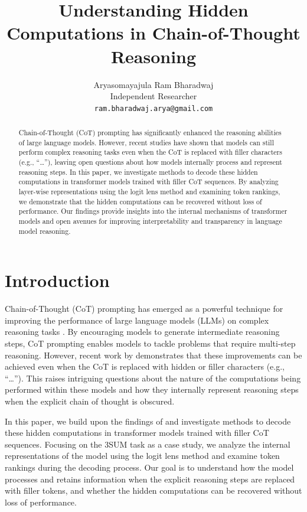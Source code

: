 \documentclass{article}
\title{Understanding Hidden Computations in Chain-of-Thought Reasoning}
\author{Aryasomayajula Ram Bharadwaj \\
Independent Researcher \\
\texttt{ram.bharadwaj.arya@gmail.com}}
\date{}
\begin{document}
\maketitle

\begin{abstract}
Chain-of-Thought (CoT) prompting has significantly enhanced the reasoning abilities of large language models. However, recent studies have shown that models can still perform complex reasoning tasks even when the CoT is replaced with filler characters (e.g., ``\ldots''), leaving open questions about how models internally process and represent reasoning steps. In this paper, we investigate methods to decode these hidden computations in transformer models trained with filler CoT sequences. By analyzing layer-wise representations using the logit lens method and examining token rankings, we demonstrate that the hidden computations can be recovered without loss of performance. Our findings provide insights into the internal mechanisms of transformer models and open avenues for improving interpretability and transparency in language model reasoning.
\end{abstract}

\section{Introduction}

Chain-of-Thought (CoT) prompting has emerged as a powerful technique for improving the performance of large language models (LLMs) on complex reasoning tasks \cite{wei2022chain}. By encouraging models to generate intermediate reasoning steps, CoT prompting enables models to tackle problems that require multi-step reasoning. However, recent work by \cite{pfau2023let} demonstrates that these improvements can be achieved even when the CoT is replaced with hidden or filler characters (e.g., ``\ldots''). This raises intriguing questions about the nature of the computations being performed within these models and how they internally represent reasoning steps when the explicit chain of thought is obscured.

In this paper, we build upon the findings of \cite{pfau2023let} and investigate methods to decode these hidden computations in transformer models trained with filler CoT sequences. Focusing on the 3SUM task as a case study, we analyze the internal representations of the model using the logit lens method \cite{nostalgebraist2020} and examine token rankings during the decoding process. Our goal is to understand how the model processes and retains information when the explicit reasoning steps are replaced with filler tokens, and whether the hidden computations can be recovered without loss of performance.
\end{document}
